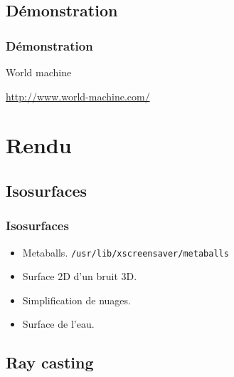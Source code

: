 \documentclass[hyperref={pdfpagelabels=false}]{beamer}
\begin{document}
\subsection{Démonstration}
\begin{frame}
  \frametitle{Démonstration}
  \begin{center}
  {\Huge World machine}
  
  \vspace{1em}
  \url{http://www.world-machine.com/}
  \end{center}
\end{frame}

\section{Rendu}

\subsection{Isosurfaces}
\begin{frame}
  \frametitle{Isosurfaces}
  \begin{itemize}
    \item Metaballs. {\tiny\texttt{/usr/lib/xscreensaver/metaballs}}
    \item Surface 2D d'un bruit 3D.
    \item Simplification de nuages.
    \item Surface de l'eau.
  \end{itemize}
\end{frame}

\subsection{Ray casting}
\end{document}
